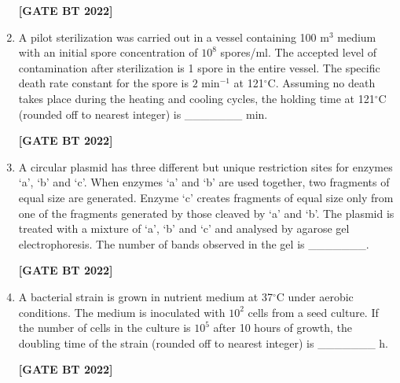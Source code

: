 \documentclass[12pt]{article}
\begin{document}
\begin{enumerate}[leftmargin=2.5em, label=\textbf{Q.\arabic*}., itemsep=2em, resume]
\noindent \textbf{[GATE BT 2022]}

\item A pilot sterilization was carried out in a vessel containing 100 m$^3$ medium with an initial spore concentration of $10^8$ spores/ml.  
The accepted level of contamination after sterilization is 1 spore in the entire vessel.  
The specific death rate constant for the spore is $2$ min$^{-1}$ at 121$^\circ$C.  
Assuming no death takes place during the heating and cooling cycles, the holding time at 121$^\circ$C (rounded off to nearest integer) is \_\_\_\_\_\_\_ min.

\noindent \textbf{[GATE BT 2022]}

\item A circular plasmid has three different but unique restriction sites for enzymes ‘a’, ‘b’ and ‘c’.  
When enzymes ‘a’ and ‘b’ are used together, two fragments of equal size are generated.  
Enzyme ‘c’ creates fragments of equal size only from one of the fragments generated by those cleaved by ‘a’ and ‘b’.  
The plasmid is treated with a mixture of ‘a’, ‘b’ and ‘c’ and analysed by agarose gel electrophoresis.  
The number of bands observed in the gel is \_\_\_\_\_\_\_.

\noindent \textbf{[GATE BT 2022]}

\item A bacterial strain is grown in nutrient medium at 37$^\circ$C under aerobic conditions.  
The medium is inoculated with $10^2$ cells from a seed culture.  
If the number of cells in the culture is $10^5$ after 10 hours of growth, the doubling time of the strain (rounded off to nearest integer) is \_\_\_\_\_\_\_ h.

\noindent \textbf{[GATE BT 2022]}

\end{enumerate}
\end{document}
